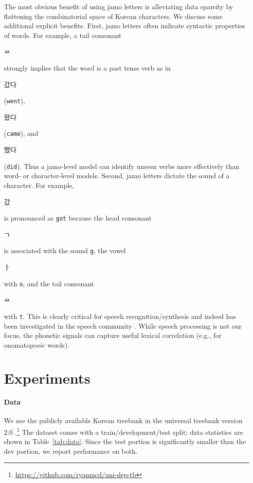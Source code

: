 \documentclass[11pt,letterpaper]{article}
\begin{document}
\begin{CJK}{UTF8}{gbsn}
The most obvious benefit of using jamo letters is alleviating data sparsity by flattening the combinatorial space of Korean characters.
We discuss some additional explicit benefits.
First, jamo letters often indicate syntactic properties of words.
For example, a tail consonant \begin{CJK}{UTF8}{mj}ㅆ\end{CJK} strongly implies that the word is a past tense verb
as in \begin{CJK}{UTF8}{mj}갔다\end{CJK} (\texttt{went}), \begin{CJK}{UTF8}{mj}왔다\end{CJK} (\texttt{came}), and \begin{CJK}{UTF8}{mj}했다\end{CJK} (\texttt{did}).
      Thus a jamo-level model can identify unseen verbs more effectively than word- or character-level models.
Second, jamo letters dictate the sound of a character.
For example, \begin{CJK}{UTF8}{mj}갔\end{CJK} is pronounced as \texttt{got} because the head consonant
\begin{CJK}{UTF8}{mj}ㄱ\end{CJK} is associated with the sound \texttt{g}, the vowel
\begin{CJK}{UTF8}{mj}ㅏ\end{CJK} with \texttt{o}, and the tail consonant
\begin{CJK}{UTF8}{mj}ㅆ\end{CJK} with \texttt{t}.
This is clearly critical for speech recognition/synthesis and indeed has been investigated in the speech community \cite{lee1994phonemie,sakti2010korean}.
While speech processing is not our focus, the phonetic signals can capture useful lexical correlation (e.g., for onomatopoeic words).

\section{Experiments}
\label{sec:experiments}

\paragraph{Data}
We use the publicly available Korean treebank in the universal treebank version 2.0 \cite{mcdonald2013universal}.\footnote{\url{https://github.com/ryanmcd/uni-dep-tb}}
The dataset comes with a train/development/test split; data statistics are shown in Table~\ref{tab:data}.
Since the test portion is significantly smaller than the dev portion, we report performance on both.



\end{CJK}
\end{document}
